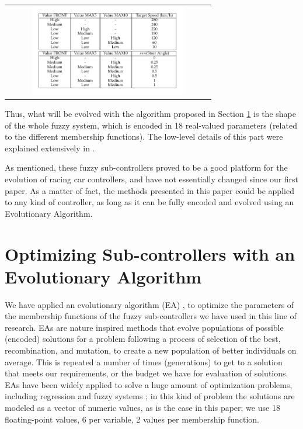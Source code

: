 \documentclass[10pt,journal,compsoc]{IEEEtran}
\begin{document}
\begin{table}[h!tb]
{%
%      
  \begin{tabular}{c}
\includegraphics[width=9cm, height=4cm, clip=true, trim=0cm 0cm 0cm 0cm]{fig/table1.pdf} 
\end{tabular}
}
\end{table}



Thus, what will be evolved with the algorithm proposed in Section
\ref{sec:ga} is the shape of the whole fuzzy system, which is encoded
in 18 real-valued parameters (related to the different membership
functions). The low-level details of this part were explained
extensively in \cite{DBLP:conf/cig/SalemMG19}. 

As mentioned, these fuzzy sub-controllers proved to be a good platform for the evolution of racing car controllers, and have not essentially changed since our first paper. As a matter of fact, the methods presented in this paper could
be applied to any kind of controller, as long as it can be fully
encoded and evolved using an Evolutionary Algorithm. 

\section{Optimizing Sub-controllers with an Evolutionary Algorithm}
\label{sec:ga}

We have applied an evolutionary algorithm (EA) \cite{EAs_Back96}, to optimize the parameters of the membership functions of the fuzzy sub-controllers we have used in this line of research.
EAs are nature inspired methods that evolve populations of possible (encoded) solutions for a problem following a process of selection of the best,
recombination, and mutation, to create a new population of better individuals on average. This is repeated a number of times
(generations) to get to a solution that meets our requirements, or the
budget we have for evaluation of solutions. EAs have been widely
applied to solve a huge amount of optimization problems, including regression and fuzzy systems \cite{hoffmann2001evolutionary}; in this kind of problem the solutions are modeled as a vector of numeric values, as is the
case in this paper; we use 18 floating-point values, 6 per variable, 2 values per membership function.
\end{document}
